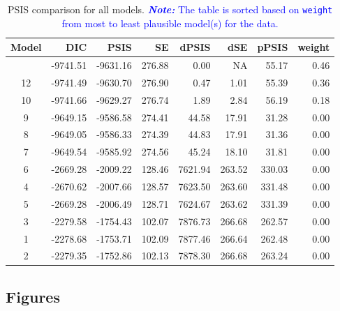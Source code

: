 \documentclass[
  authoryear,
  preprint,
  1p]{elsarticle}
\begin{document}
\begin{longtable}[]{@{}crrrrrrr@{}}

\caption{\label{tbl-rq3-psis}PSIS comparison for all models.
\textcolor{blue}{\textbf{\emph{Note:}} The table is sorted based on \texttt{weight} from
most to least plausible model(s) for the data.}}

\tabularnewline

\toprule\noalign{}
Model & DIC & PSIS & SE & dPSIS & dSE & pPSIS & weight \\
\midrule\noalign{}
\endhead
\bottomrule\noalign{}
\endlastfoot
11 & -9741.51 & -9631.16 & 276.88 & 0.00 & NA & 55.17 & 0.46 \\
12 & -9741.49 & -9630.70 & 276.90 & 0.47 & 1.01 & 55.39 & 0.36 \\
10 & -9741.66 & -9629.27 & 276.74 & 1.89 & 2.84 & 56.19 & 0.18 \\
9 & -9649.15 & -9586.58 & 274.41 & 44.58 & 17.91 & 31.28 & 0.00 \\
8 & -9649.05 & -9586.33 & 274.39 & 44.83 & 17.91 & 31.36 & 0.00 \\
7 & -9649.54 & -9585.92 & 274.56 & 45.24 & 18.10 & 31.81 & 0.00 \\
6 & -2669.28 & -2009.22 & 128.46 & 7621.94 & 263.52 & 330.03 & 0.00 \\
4 & -2670.62 & -2007.66 & 128.57 & 7623.50 & 263.60 & 331.48 & 0.00 \\
5 & -2669.28 & -2006.49 & 128.71 & 7624.67 & 263.62 & 331.39 & 0.00 \\
3 & -2279.58 & -1754.43 & 102.07 & 7876.73 & 266.68 & 262.57 & 0.00 \\
1 & -2278.68 & -1753.71 & 102.09 & 7877.46 & 266.64 & 262.48 & 0.00 \\
2 & -2279.35 & -1752.86 & 102.13 & 7878.30 & 266.68 & 263.24 & 0.00 \\

\end{longtable}

\newpage{}

\subsection{Figures}\label{sec-appC}
\end{document}
